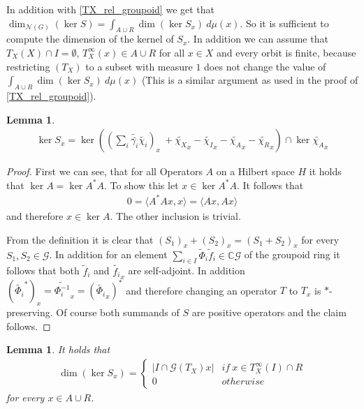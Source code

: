 \documentclass[12pt,a4paper]{scrartcl}
\theoremstyle{plain}
\newtheorem{Lemma}[Theorem]{Lemma}
\theoremstyle{definition}
\numberwithin{equation}{section}
\newcommand{\C}{\mathbb{C}} %
\newcommand{\2}{\mathbb{Z} / 2 \mathbb{Z}}
\newcommand{\G}{\mathcal{G}}
\newcommand{\1}{\bar{1}}
\newcommand{\0}{\bar{0}}
\begin{document}
In addition with \ref{TX_rel_groupoid} we get that $\dim_{\mathcal{N}(G)}(\ker S) = \int_{A \cup R} \dim (\ker S_x) \ d \mu (x)$. So it is sufficient to compute the dimension of the kernel of $S_x$. In addition we can assume that $T_X(X) \cap I= \emptyset$, $T_X^\infty(x) \in A \cup R$ for all $x \in X$ and every orbit is finite, because restricting $(T_X)$ to a subset with measure $1$ does not change the value of $\int_{A \cup R} \dim (\ker S_x) \ d \mu (x)$ (This is a similar argument as used in the proof of \ref{TX_rel_groupoid}).
\begin{Lemma}
	\begin{align*}
	\ker S_x = \ker((\sum_{i} \tilde{\bar{\gamma_i}} \tilde{\chi_i})_x \ + \tilde{\chi_X}_x - \tilde{\chi_I}_x - \tilde{\chi_A}_x - \tilde{\chi_R}_x) \cap \ker \tilde{\chi_A}_x
	\end{align*}
\end{Lemma}
\begin{proof}
	First we can see, that for all Operators $A$ on a Hilbert space $H$ it holds that $\ker A = \ker A^*A$. To show this let $x \in \ker A^*A$. It follows that
	\begin{align*}
		0 = \langle A^*Ax, x \rangle = \langle Ax, Ax \rangle
	\end{align*}
	and therefore $x \in \ker A$. The other inclusion is trivial. 
	
	From the definition it is clear that $(S_1)_x + (S_2)_x = (S_1 + S_2)_x$ for every $S_1, S_2 \in \G$. In addition for an element $\sum_{i \in I} \tilde \Phi_i\tilde f_i \in \C\G$ of the  groupoid ring it follows that both $\tilde f_i$ and $\tilde {f_i}_x$ are self-adjoint. In addition $(\widetilde {\Phi_i}^*)_x = \widetilde {\Phi_i^{-1}}_x = (\widetilde {\Phi_i}_x)^*$  and therefore changing an operator $T$ to $T_x$ is $*$-preserving. Of course both summands of $S$ are positive operators and the claim follows.
\end{proof}
\begin{Lemma} \label{kerSx_berechnen}
	It holds that
	\begin{align*}
		\dim (\ker S_x) = \begin{cases}
		|I \cap \G (T_X)x| & if \ x \in T_X^\infty(I) \cap R\\
		0 & otherwise 
		\end{cases}
	\end{align*}
	for every $x \in A \cup R$.
\end{Lemma}
\end{document}
